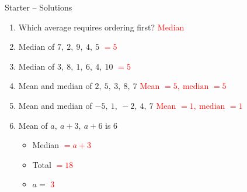 \documentclass{beamer}
\begin{document}
\begin{frame}{Starter -- Solutions}
\vspace{-0.8em}

\footnotesize
\begin{enumerate}\itemsep2pt
  \item Which average requires ordering first?  
        \textcolor{red}{Median}
  \item Median of $7,\ 2,\ 9,\ 4,\ 5$  
        \textcolor{red}{$=5$}
  \item Median of $3,\ 8,\ 1,\ 6,\ 4,\ 10$  
        \textcolor{red}{$=5$}
  \item Mean and median of $2,\ 5,\ 3,\ 8,\ 7$  
        \textcolor{red}{Mean $=5,\ \text{median }=5$}
  \item Mean and median of $-5,\ 1,\ -2,\ 4,\ 7$  
        \textcolor{red}{Mean $=1,\ \text{median }=1$}
  \item Mean of $a,\ a+3,\ a+6$ is $6$
        \begin{itemize}\footnotesize
          \item Median \textcolor{red}{$=a+3$}
          \item Total \textcolor{red}{$=18$}
          \item $a=$ \textcolor{red}{$3$}
        \end{itemize}
\end{enumerate}
\end{frame}
\end{document}
